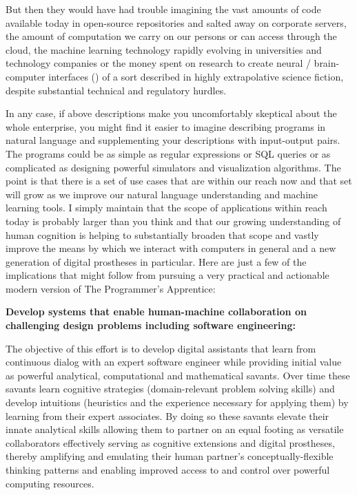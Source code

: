 But then they would have had trouble imagining the vast amounts of code available today in open-source repositories and salted away on corporate servers, the amount of computation we carry on our persons or can access through the cloud, the machine learning technology rapidly evolving in universities and technology companies or the money spent on research to create neural / brain-computer interfaces ({}) of a sort described in highly extrapolative science fiction, despite substantial technical and regulatory hurdles.

In any case, if above descriptions make you uncomfortably skeptical about the whole enterprise, you might find it easier to imagine describing programs in natural language and supplementing your descriptions with input-output pairs. The programs could be as simple as regular expressions or SQL queries or as complicated as designing powerful simulators and visualization algorithms. The point is that there is a set of use cases that are within our reach now and that set will grow as we improve our natural language understanding and machine learning tools. I simply maintain that the scope of applications within reach today is probably larger than you think and that our growing understanding of human cognition is helping to substantially broaden that scope and vastly improve the means by which we interact with computers in general and a new generation of digital prostheses in particular. Here are just a few of the implications that might follow from pursuing a very practical and actionable modern version of The Programmer's Apprentice:


{\bf{Develop systems that enable human-machine collaboration on challenging design problems including software engineering:}}

The objective of this effort is to develop digital assistants that learn from continuous dialog with an expert software engineer while providing initial value as powerful analytical, computational and mathematical savants. Over time these savants learn cognitive strategies (domain-relevant problem solving skills) and develop intuitions (heuristics and the experience necessary for applying them) by learning from their expert associates. By doing so these savants elevate their innate analytical skills allowing them to partner on an equal footing as versatile collaborators \emdash{} effectively serving as cognitive extensions and digital prostheses, thereby amplifying and emulating their human partner's conceptually-flexible thinking patterns and enabling improved access to and control over powerful computing resources. 

